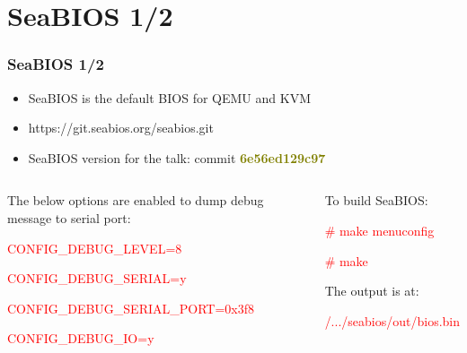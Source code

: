 \documentclass[aspectratio=169]{beamer}
\begin{document}
\section{SeaBIOS 1/2}
\begin{frame}
\frametitle{SeaBIOS 1/2}
\begin{itemize}
\item {\Large SeaBIOS is the default BIOS for QEMU and KVM}
\item {\Large https://git.seabios.org/seabios.git}
\item {\Large SeaBIOS version for the talk: commit \textbf{\textcolor{olive}{6e56ed129c97}}}
\end{itemize}
\begin{columns}[c]
\begin{block}{}
{
The below options are enabled to dump debug message to serial port: \newline

\textcolor{red}{CONFIG\_DEBUG\_LEVEL=8}

\textcolor{red}{CONFIG\_DEBUG\_SERIAL=y}

\textcolor{red}{CONFIG\_DEBUG\_SERIAL\_PORT=0x3f8}

\textcolor{red}{CONFIG\_DEBUG\_IO=y}

}
\end{block}
\begin{block}{}
{
To build SeaBIOS:

\textcolor{red}{\# make menuconfig}

\textcolor{red}{\# make} \newline

The output is at:

\textcolor{red}{/.../seabios/out/bios.bin}
}
\end{block}
\end{columns}
\end{frame}

\end{document}
